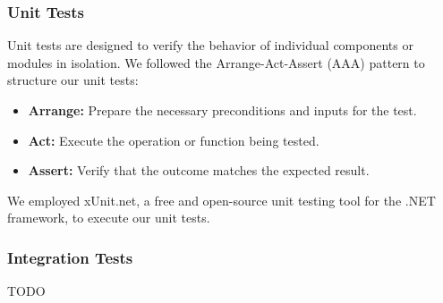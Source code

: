 \subsubsection{Unit Tests}
Unit tests are designed to verify the behavior of individual components or modules in isolation. We followed the Arrange-Act-Assert (AAA) pattern to structure our unit tests:

\begin{itemize} 
	\item \textbf{Arrange:} Prepare the necessary preconditions and inputs for the test. 
	\item \textbf{Act:} Execute the operation or function being tested. 
	\item \textbf{Assert:} Verify that the outcome matches the expected result. 
\end{itemize}

We employed xUnit.net, a free and open-source unit testing tool for the .NET framework, to execute our unit tests.

\subsubsection{Integration Tests}

TODO
